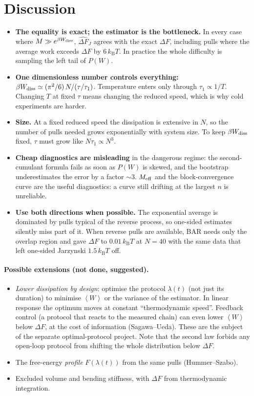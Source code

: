 \documentclass[11pt,a4paper]{article}
\newcommand{\kT}{k_{\mathrm B}T}
\newcommand{\avg}[1]{\left\langle #1\right\rangle}
\newcommand{\Wd}{W_{\rm diss}}
\newcommand{\dFJ}{\widehat{\Delta F}_J}
\begin{document}
\section{Discussion}
\label{sec:discussion}

\begin{itemize}[leftmargin=*]
\item \textbf{The equality is exact; the estimator is the bottleneck.} In every case where
$M\gg e^{\beta\Wd}$, $\dFJ$ agrees with the exact $\Delta F$, including pulls where the
average work exceeds $\Delta F$ by $6\,\kT$. In practice the whole difficulty is sampling the
left tail of $P(W)$.
\item \textbf{One dimensionless number controls everything:} $\beta\Wd\simeq(\pi^2/6)\,N/(\tau/\tau_1)$.
Temperature enters only through $\tau_1\propto1/T$. Changing $T$ at fixed $\tau$ means changing the
reduced speed, which is why cold experiments are harder.
\item \textbf{Size.} At a fixed reduced speed the dissipation is extensive in $N$, so the
number of pulls needed grows exponentially with system size. To keep $\beta\Wd$ fixed,
$\tau$ must grow like $N\tau_1\propto N^3$.
\item \textbf{Cheap diagnostics are misleading} in the dangerous regime: the second-cumulant
formula fails as soon as $P(W)$ is skewed, and the bootstrap underestimates the error by a
factor $\sim3$. $M_{\rm eff}$ and the block-convergence curve are the useful diagnostics: a
curve still drifting at the largest $n$ is unreliable.
\item \textbf{Use both directions when possible.} The exponential average is dominated by
pulls typical of the reverse process, so one-sided estimates silently miss part of it. When reverse
pulls are available, BAR needs only the overlap region and gave $\Delta F$ to $0.01\,\kT$ at $N=40$
with the same data that left one-sided Jarzynski $1.5\,\kT$ off.
\end{itemize}

\paragraph{Possible extensions (not done, suggested).}
\begin{itemize}[leftmargin=*,itemsep=1pt]
\item \emph{Lower dissipation by design}: optimise the protocol $\lambda(t)$ (not just its
duration) to minimise $\avg W$ or the variance of the estimator. In linear response the
optimum moves at constant ``thermodynamic speed''. Feedback control (a protocol that reacts to
the measured chain) can even lower $\avg W$ below $\Delta F$, at the cost of information (Sagawa--Ueda).
These are the subject of the separate optimal-protocol project. Note that the second law forbids any
open-loop protocol from shifting the whole distribution below $\Delta F$.
\item The free-energy \emph{profile} $F(\lambda(t))$ from the same pulls (Hummer--Szabo).
\item Excluded volume and bending stiffness, with $\Delta F$ from thermodynamic integration.
\end{itemize}
\end{document}
